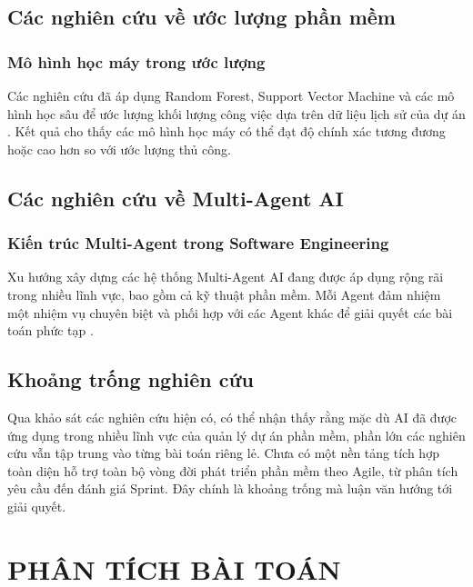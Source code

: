 \documentclass[12pt,a4paper]{report}
\begin{document}
\section{Các nghiên cứu về ước lượng phần mềm}

\subsection{Mô hình học máy trong ước lượng}

Các nghiên cứu đã áp dụng Random Forest, Support Vector Machine và các mô hình học sâu để ước lượng khối lượng công việc dựa trên dữ liệu lịch sử của dự án \cite{russell2021}. Kết quả cho thấy các mô hình học máy có thể đạt độ chính xác tương đương hoặc cao hơn so với ước lượng thủ công.

\section{Các nghiên cứu về Multi-Agent AI}

\subsection{Kiến trúc Multi-Agent trong Software Engineering}

Xu hướng xây dựng các hệ thống Multi-Agent AI đang được áp dụng rộng rãi trong nhiều lĩnh vực, bao gồm cả kỹ thuật phần mềm. Mỗi Agent đảm nhiệm một nhiệm vụ chuyên biệt và phối hợp với các Agent khác để giải quyết các bài toán phức tạp \cite{russell2021}.

\section{Khoảng trống nghiên cứu}

Qua khảo sát các nghiên cứu hiện có, có thể nhận thấy rằng mặc dù AI đã được ứng dụng trong nhiều lĩnh vực của quản lý dự án phần mềm, phần lớn các nghiên cứu vẫn tập trung vào từng bài toán riêng lẻ. Chưa có một nền tảng tích hợp toàn diện hỗ trợ toàn bộ vòng đời phát triển phần mềm theo Agile, từ phân tích yêu cầu đến đánh giá Sprint. Đây chính là khoảng trống mà luận văn hướng tới giải quyết.

\chapter{PHÂN TÍCH BÀI TOÁN}
\label{chap:problem_analysis}
\end{document}
